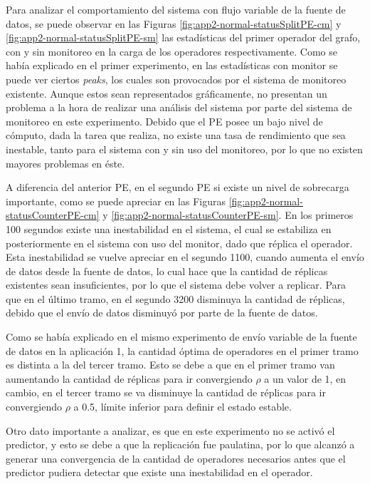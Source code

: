 Para analizar el comportamiento del sistema con flujo variable de la fuente de datos, se puede observar en las Figuras \ref{fig:app2-normal-statusSplitPE-cm} y \ref{fig:app2-normal-statusSplitPE-sm} las estadísticas del primer operador del grafo, con y sin monitoreo en la carga de los operadores respectivamente. Como se había explicado en el primer experimento, en las estadísticas con monitor se puede ver ciertos \textit{peaks}, los cuales son provocados por el sistema de monitoreo existente. Aunque estos sean representados gráficamente, no presentan un problema a la hora de realizar una análisis del sistema por parte del sistema de monitoreo en este experimento. Debido que el PE posee un bajo nivel de cómputo, dada la tarea que realiza, no existe una tasa de rendimiento que sea inestable, tanto para el sistema con y sin uso del monitoreo, por lo que no existen mayores problemas en éste.

A diferencia del anterior PE, en el segundo PE si existe un nivel de sobrecarga importante, como se puede apreciar en las Figuras \ref{fig:app2-normal-statusCounterPE-cm} y \ref{fig:app2-normal-statusCounterPE-sm}. En los primeros 100 segundos existe una inestabilidad en el sistema, el cual se estabiliza en posteriormente en el sistema con uso del monitor, dado que réplica el operador. Esta inestabilidad se vuelve apreciar en el segundo 1100, cuando aumenta el envío de datos desde la fuente de datos, lo cual hace que la cantidad de réplicas existentes sean insuficientes, por lo que el sistema debe volver a replicar. Para que en el último tramo, en el segundo 3200 disminuya la cantidad de réplicas, debido que el envío de datos disminuyó por parte de la fuente de datos.

Como se había explicado en el mismo experimento de envío variable de la fuente de datos en la aplicación 1, la cantidad óptima de operadores en el primer tramo es distinta a la del tercer tramo. Esto se debe a que en el primer tramo van aumentando la cantidad de réplicas para ir convergiendo $\rho$ a un valor de 1, en cambio, en el tercer tramo se va disminuye la cantidad de réplicas para ir convergiendo $\rho$ a 0.5, límite inferior para definir el estado estable.

Otro dato importante a analizar, es que en este experimento no se activó el predictor, y esto se debe a que la replicación fue paulatina, por lo que alcanzó a generar una convergencia de la cantidad de operadores necesarios antes que el predictor pudiera detectar que existe una inestabilidad en el operador.

